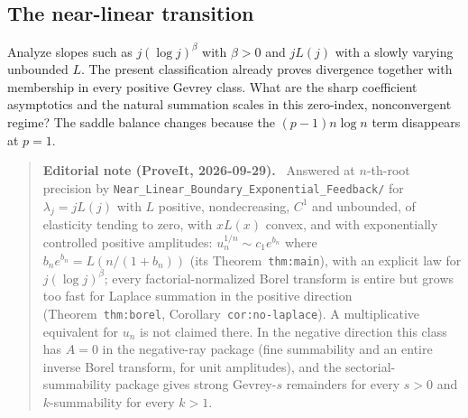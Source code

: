 \documentclass[11pt,a4paper]{article}
\numberwithin{equation}{section}
\theoremstyle{definition}
\theoremstyle{remark}
\newenvironment{ednote}{\par\smallskip\begin{quote}\small\raggedright\textbf{Editorial note (ProveIt, 2026-09-29).}\ }{\end{quote}\smallskip}
\begin{document}
\subsection{The near-linear transition}
Analyze slopes such as $j(\log j)^\beta$ with $\beta>0$ and
$jL(j)$ with a slowly varying unbounded $L$.  The present classification
already proves divergence together with membership in every positive
Gevrey class.  What are the sharp coefficient asymptotics and the natural
summation scales in this zero-index, nonconvergent regime?  The saddle
balance changes because the $(p-1)n\log n$ term disappears at $p=1$.
\begin{ednote}
Answered at $n$-th-root precision by
\nolinkurl{Near_Linear_Boundary_Exponential_Feedback/} for
$\lambda_j=jL(j)$ with $L$ positive, nondecreasing, $C^1$ and unbounded,
of elasticity tending to zero, with $xL(x)$ convex, and with exponentially
controlled positive amplitudes: $u_n^{1/n}\sim c_1e^{b_n}$ where
$b_ne^{b_n}=L(n/(1+b_n))$ (its Theorem~\texttt{thm:main}), with an explicit law for
$j(\log j)^\beta$; every factorial-normalized Borel transform is entire but
grows too fast for Laplace summation in the positive direction
(Theorem~\texttt{thm:borel}, Corollary~\texttt{cor:no-laplace}). A multiplicative equivalent
for $u_n$ is not claimed there. In the negative direction this class has
$A=0$ in the negative-ray package (fine summability and an entire inverse
Borel transform, for unit amplitudes), and the sectorial-summability
package gives strong Gevrey-$s$ remainders for every $s>0$ and
$k$-summability for every $k>1$.
\end{ednote}
\end{document}
